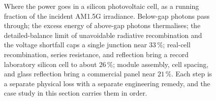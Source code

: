 \begin{figure}[htbp]
\caption[Silicon solar-cell efficiency waterfall]{Where the power goes in a
silicon photovoltaic cell, as a running fraction of the incident AM1.5G
irradiance. Below-gap photons pass through; the excess energy of above-gap
photons thermalises; the detailed-balance limit of unavoidable radiative
recombination and the voltage shortfall caps a single junction near
$33\,\%$; real-cell recombination, series resistance, and reflection bring a
record laboratory silicon cell to about $26\,\%$; module assembly, cell
spacing, and glass reflection bring a commercial panel near $21\,\%$. Each
step is a separate physical loss with a separate engineering remedy, and the
case study in this section carries them in order.}
\label{fig:vol04ch12:sc-cell-loss-waterfall}
\end{figure}
